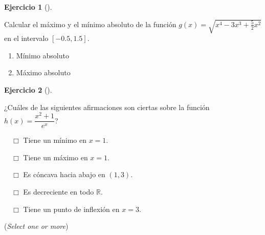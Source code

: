 \documentclass[
  a4paper,
]{scrreport}
\theoremstyle{definition}
\newtheorem{exercise}{Ejercicio}[chapter]
\theoremstyle{remark}
\begin{document}
\begin{exercise}[]\protect\hypertarget{exr-extremos-absolutos}{}\label{exr-extremos-absolutos}

Calcular el máximo y el mínimo absoluto de la función
\(g(x)=\sqrt{x^4-3x^3+\frac{5}{2}x^2}\) en el intervalo \([-0.5,1.5]\).

\begin{enumerate}
\def\labelenumi{\alph{enumi}.}
\item
  Mínimo absoluto

  \vspace{18pt}
\item
  Máximo absoluto

  \vspace{18pt}
\end{enumerate}

\end{exercise}

\begin{exercise}[]\protect\hypertarget{exr-extremos-puntos-inflexion}{}\label{exr-extremos-puntos-inflexion}

¿Cuáles de las siguientes afirmaciones son ciertas sobre la función
\(h(x)=\dfrac{x^2+1}{e^x}\)?

${\quad\Box}$ Tiene un mínimo en $x=1$.

${\quad\Box}$ Tiene un máximo en $x=1$.

${\quad\Box}$ Es cóncava hacia abajo en $(1,3)$.

${\quad\Box}$ Es decreciente en todo $\mathbb{R}$.

${\quad\Box}$ Tiene un punto de inflexión en $x=3$.

(\emph{Select one or more})

\end{exercise}
\end{document}
